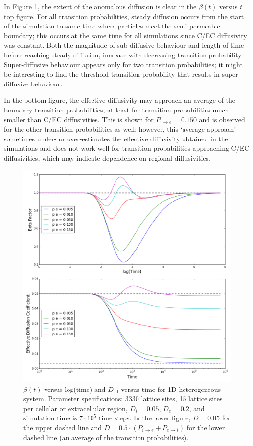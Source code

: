 	 In Figure \ref{fig:pie_beta_deff_1D}, the extent of the anomalous diffusion is clear in the $ \beta (t) $ versus $ t $ top figure. For all transition probabilities, steady diffusion occurs from the start of the simulation to some time where particles meet the semi-permeable boundary; this occurs at the same time for all simulations since C/EC diffusivity was constant. Both the magnitude of sub-diffusive behaviour and length of time before reaching steady diffusion, increase with decreasing transition probability. Super-diffusive behaviour appears only for two transition probabilities; it might be interesting to find the threshold transition probability that results in super-diffusive behaviour.
	 
	 In the bottom figure, the effective diffusivity may approach an average of the boundary transition probabilities, at least for transition probabilities much smaller than C/EC diffusivities. This is shown for $ P_{i \rightarrow e} = 0.150 $ and is observed for the other transition probabilities as well; however, this `average approach' sometimes under- or over-estimates the effective diffusivity obtained in the simulations and does not work well for transition probabilities approaching C/EC diffusivities, which may indicate dependence on regional diffusivities.
	
	\begin{figure}[h!]
		\centering
		\includegraphics[width=1.0\linewidth]{../images/1D/pie_beta_deff_1D}
		\caption{$ \beta (t) $ versus log(time) and $ D_\textrm{eff} $ versus time for 1D heterogeneous system. Parameter specifications: 3330 lattice sites, 15 lattice sites per cellular or extracellular region, $ D_i = 0.05 $, $ D_e = 0.2 $, and simulation time is $ 7\cdot 10^5 $ time steps. In the lower figure, $ D = 0.05 $ for the upper dashed line and $ D = 0.5 \cdot (P_{i \rightarrow e} + P_{e \rightarrow i}) $ for the lower dashed line (an average of the transition probabilities).}
		\label{fig:pie_beta_deff_1D}
	\end{figure}

